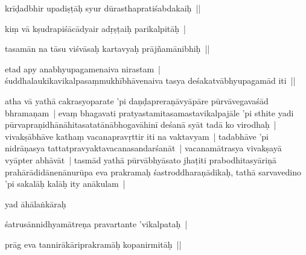 \documentclass[article,12pt,a4paper]{memoir}%
\newcounter{parCount}
\begin{document}
	  \pstart \leavevmode%
	krīḍadbhir upadiṣṭāḥ syur dūrasthapratiśabdakaiḥ || 
	{}
	\pend%
      

	  \pstart \leavevmode%
	kiṃ vā kṣudrapiśācādyair adṛṣṭaiḥ parikalpitāḥ | 
	{}
	\pend%
      

	  \pstart \leavevmode%
	tasamān na tāsu viśvāsaḥ kartavyaḥ prājñamānibhiḥ ||
	{}
	\pend%
      

	  \pstart \leavevmode%
	etad apy anabhyupagamenaiva nirastam | śuddhalaukikavikalpasaṃmukhībhāvenaiva tasya deśakatvābhyupagamād iti || 
	{}
	\pend%
      

	  \pstart \leavevmode%
	\label{thakur75-25.11}atha vā yathā cakrasyoparate 'pi daṇḍapreraṇāvyāpāre pūrvāvegavaśād bhramaṇam | evaṃ bhagavati pratyastamitasamastavikalpajāle 'pi sthite yadi pūrvapraṇidhānāhitasatatānābhogavāhinī deśanā syāt tadā ko virodhaḥ | vivakṣābhāve kathaṃ vacanapravṛttir iti na vaktavyam | tadabhāve 'pi nidrāṇasya tattatpravyaktavacanasandarśanāt | vacanamātrasya vivakṣayā vyāpter abhāvāt | tasmād yathā pūrvābhyāsato jhaṭiti prabodhitasyāriṇā prahārādidānenānurūpa eva prakramaḥ śastroddharaṇādikaḥ, tathā sarvavedino 'pi sakalāḥ kalāḥ ity anākulam | 
	{}
	\pend%
      

	  \pstart \leavevmode%
	yad āhālaṅkāraḥ 
	{}
	\pend%
      

	  \pstart \leavevmode%
	śatrusānnidhyamātreṇa pravartante 'vikalpataḥ | 
	{}
	\pend%
      

	  \pstart \leavevmode%
	prāg eva tannirākāriprakramāḥ kopanirmitāḥ || 
	{}
	\pend%
      
\end{document}
